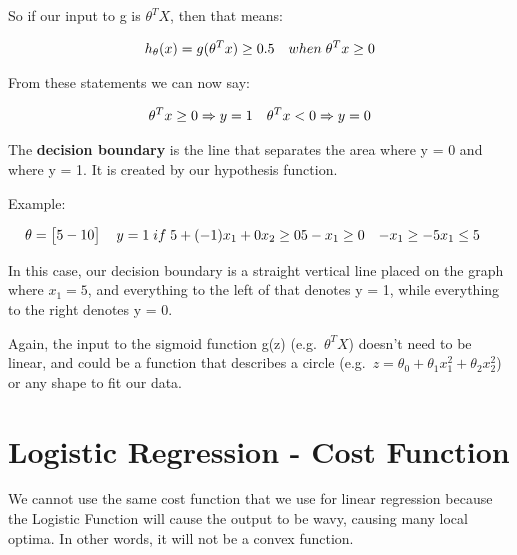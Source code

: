 \documentclass[
]{book}
\begin{document}
So if our input to g is \(\theta^T X\), then that means:

\begin{align}& h_\theta(x) = g(\theta^T x) \geq 0.5 \newline& when \; \theta^T x \geq 0\end{align}

From these statements we can now say:

\begin{align}& \theta^T x \geq 0 \Rightarrow y = 1 \newline& \theta^T x < 0 \Rightarrow y = 0 \newline\end{align}

The \textbf{decision boundary} is the line that separates the area where y = 0 and where y = 1. It is created by our hypothesis function.

Example:

\begin{align}& \theta = \begin{bmatrix}5 \newline -1 \newline 0\end{bmatrix} \newline & y = 1 \; if \; 5 + (-1) x_1 + 0 x_2 \geq 0 \newline & 5 - x_1 \geq 0 \newline & - x_1 \geq -5 \newline& x_1 \leq 5 \newline \end{align}

In this case, our decision boundary is a straight vertical line placed on the graph where \(x_1 = 5\), and everything to the left of that denotes y = 1, while everything to the right denotes y = 0.

Again, the input to the sigmoid function g(z) (e.g.~\(\theta^T X\)) doesn't need to be linear, and could be a function that describes a circle (e.g.~\(z = \theta_0 + \theta_1 x_1^2 +\theta_2 x_2^2\)) or any shape to fit our data.

\hypertarget{logistic-regression---cost-function}{%
\section{Logistic Regression - Cost Function}\label{logistic-regression---cost-function}}

We cannot use the same cost function that we use for linear regression because the Logistic Function will cause the output to be wavy, causing many local optima. In other words, it will not be a convex function.
\end{document}
